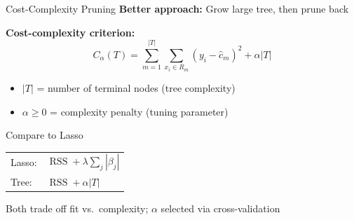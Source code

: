 \documentclass[10pt]{beamer}
\DeclareMathOperator{\RSS}{RSS}
\begin{document}
\begin{frame}{Cost-Complexity Pruning}
  \textbf{Better approach:} Grow large tree, then prune back

  \vspace{0.5em}
  \textbf{Cost-complexity criterion:}
  \[
  C_\alpha(T) = \sum_{m=1}^{|T|} \sum_{x_i \in R_m} (y_i - \widehat{c}_m)^2 + \alpha |T|
  \]

  \begin{itemize}
    \item $|T|$ = number of terminal nodes (tree complexity)
    \item $\alpha \geq 0$ = complexity penalty (tuning parameter)
  \end{itemize}

  \vspace{0.5em}
  \begin{block}{Compare to Lasso}
    \begin{tabular}{ll}
      Lasso: & $\RSS + \lambda \sum_j |\beta_j|$ \\
      Tree:  & $\RSS + \alpha |T|$
    \end{tabular}

    \vspace{0.3em}
    Both trade off fit vs.\ complexity; $\alpha$ selected via cross-validation
  \end{block}
\end{frame}

\end{document}
